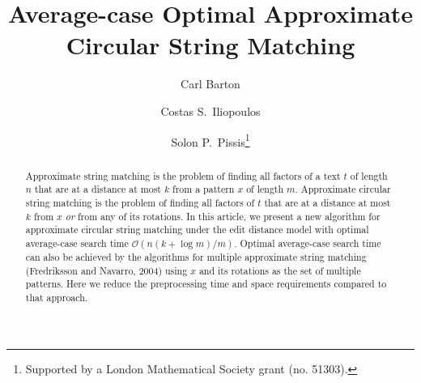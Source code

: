 \documentclass[runningheads, envcountsame, a4paper]{llncs}\usepackage{etex}
\newcommand{\cO}{\mathcal{O}}
\begin{document}
\frontmatter          \title{Average-case Optimal Approximate Circular String Matching}

\author{Carl Barton
\and Costas S.\ Iliopoulos
\and Solon P.\ Pissis\thanks{Supported by a London Mathematical Society grant (no. 51303).}
}



\maketitle

\begin{abstract}
Approximate string matching is the problem of finding all factors of a text $t$ of length $n$
that are at a distance at most $k$ from a pattern $x$ of length $m$. 
Approximate circular string matching is the problem of finding all factors of $t$
that are at a distance at most $k$ from $x$ {\em or} from any of its rotations. 
In this article, we present a new algorithm for approximate circular string matching under the edit distance model with optimal average-case search time $\cO(n(k + \log m) /m)$.
Optimal average-case search time can also be achieved by the algorithms for multiple approximate string matching (Fredriksson and Navarro, 2004) using
$x$ and its rotations as the set of multiple patterns. Here we reduce the preprocessing time and space requirements compared to that approach.
\end{abstract}
\end{document}
